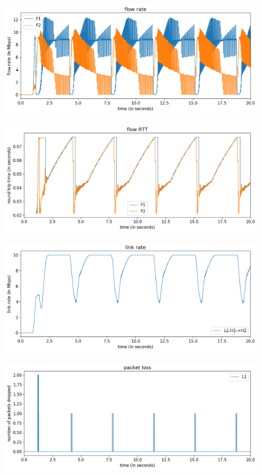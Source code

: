 \documentclass{article}
\begin{document}
\begin{figure}[H]
\centering
\includegraphics[width = \textwidth]{test_case3 flow rate.png}
\end{figure}

\begin{figure}[H]
\centering
\includegraphics[width = \textwidth]{test_case3 flow RTT.png}
\end{figure}

\begin{figure}[H]
\centering
\includegraphics[width = \textwidth]{test_case3 link rate.png}
\end{figure}

\begin{figure}[H]
\centering
\includegraphics[width = \textwidth]{test_case3 packet loss.png}
\end{figure}
\end{document}
